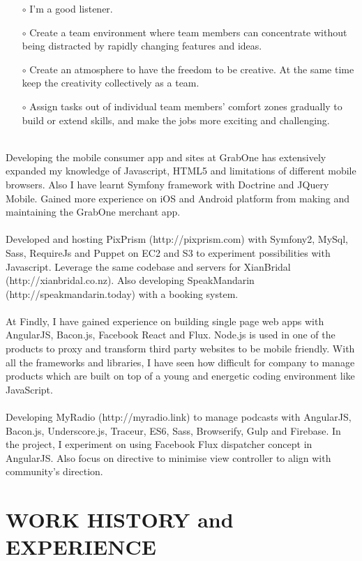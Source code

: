 \begin{resume}
\begin{itemize}
\item[$\circ$] I'm a good listener.
\item[$\circ$] Create a team environment where team members can concentrate without being distracted by rapidly changing features and ideas.
\item[$\circ$] Create an atmosphere to have the freedom to be creative. At the same time keep the creativity collectively as a team.
\item[$\circ$] Assign tasks out of individual team members' comfort zones gradually to build or extend skills, and make the jobs more exciting and challenging.\\\\
\end{itemize} 
Developing the mobile consumer app and sites at GrabOne has extensively expanded my knowledge of Javascript, HTML5 and limitations of different mobile browsers. Also I have learnt Symfony framework with Doctrine and JQuery Mobile. Gained more experience on iOS and Android platform from making and maintaining the GrabOne merchant app.\\\\
Developed and hosting PixPrism (http://pixprism.com) with Symfony2, MySql, Sass, RequireJs and Puppet on EC2 and S3 to experiment possibilities with Javascript. Leverage the same codebase and servers for XianBridal (http://xianbridal.co.nz). Also developing SpeakMandarin\\(http://speakmandarin.today) with a booking system.\\\\
At Findly, I have gained experience on building single page web apps with AngularJS, Bacon.js, Facebook React and Flux. Node.js is used in one of the products to proxy and transform third party websites to be mobile friendly. With all the frameworks and libraries, I have seen how difficult for company to manage products which are built on top of a young and energetic coding environment like JavaScript.\\\\
Developing MyRadio (http://myradio.link) to manage podcasts with AngularJS, Bacon.js, Underscore.js, Traceur, ES6, Sass, Browserify, Gulp and Firebase. In the project, I experiment on using Facebook Flux dispatcher concept in AngularJS. Also focus on directive to minimise view controller to align with community's direction.

\section{WORK HISTORY and EXPERIENCE} 
\vspace{0.15in} 


\end{resume}
